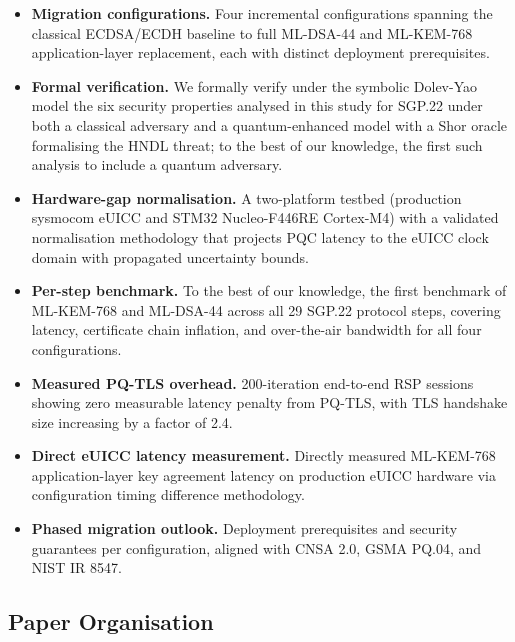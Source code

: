 \documentclass[a4paper,fleqn]{cas-sc}
\begin{document}
\begin{itemize}[leftmargin=*, noitemsep, topsep=2pt]

  \item \textbf{Migration configurations.} Four incremental configurations
  spanning the classical ECDSA/ECDH baseline to full ML-DSA-44 and
  ML-KEM-768 application-layer replacement, each with distinct deployment
  prerequisites.

  \item \textbf{Formal verification.} We formally verify under the symbolic
  Dolev-Yao model the six security properties analysed in this study for SGP.22
  under both a classical adversary and a quantum-enhanced model with a Shor
  oracle formalising the HNDL threat; to the best of our knowledge, the first
  such analysis to include a quantum adversary.

  \item \textbf{Hardware-gap normalisation.} A two-platform testbed
  (production sysmocom eUICC and STM32 Nucleo-F446RE Cortex-M4) with a
  validated normalisation methodology that projects PQC latency to the eUICC
  clock domain with propagated uncertainty bounds.

  \item \textbf{Per-step benchmark.} To the best of our knowledge, the
  first benchmark of ML-KEM-768 and ML-DSA-44 across all 29 SGP.22
  protocol steps, covering latency, certificate chain inflation, and
  over-the-air bandwidth for all four configurations.

  \item \textbf{Measured PQ-TLS overhead.} 200-iteration end-to-end RSP
  sessions showing zero measurable latency penalty from PQ-TLS, with TLS
  handshake size increasing by a factor of 2.4.

  \item \textbf{Direct eUICC latency measurement.} Directly measured
  ML-KEM-768 application-layer key agreement latency on production eUICC
  hardware via configuration timing difference methodology.

  \item \textbf{Phased migration outlook.} Deployment prerequisites and
  security guarantees per configuration, aligned with CNSA 2.0, GSMA
  PQ.04, and NIST IR 8547.

\end{itemize}

\subsection{Paper Organisation}
\end{document}
